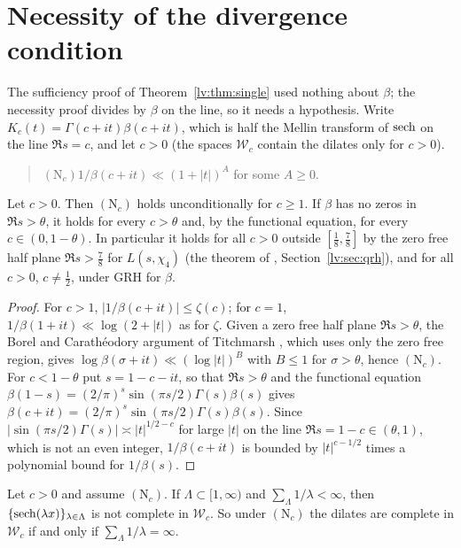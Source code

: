 \section{Necessity of the divergence condition}\label{lv:sec:nec}

The sufficiency proof of Theorem~\ref{lv:thm:single} used nothing about $\beta$; the necessity proof divides by $\beta$ on the line, so it needs a hypothesis. Write $K_c(t)=\Gamma(c+it)\beta(c+it)$, which is half the Mellin transform of $\operatorname{sech}$ on the line $\Re s=c$, and let $c>0$ (the spaces $\mathcal W_c$ contain the dilates only for $c>0$).
\begin{quote}
$(\mathrm N_c)$\quad $1/\beta(c+it)\ll(1+|t|)^{A}$ for some $A\ge0$.
\end{quote}

\begin{lemma}\label{lv:lem:Nc}
Let $c>0$. Then $(\mathrm N_c)$ holds unconditionally for $c\ge1$. If $\beta$ has no zeros in $\Re s>\theta$, it holds for every $c>\theta$ and, by the functional equation, for every $c\in(0,1-\theta)$. In particular it holds for all $c>0$ outside $[\frac18,\frac78]$ by the zero free half plane $\Re s>\frac78$ for $L(s,\chi_4)$ (the theorem of \cite{OAI26a}, Section~\ref{lv:sec:qrh}), and for all $c>0$, $c\ne\frac12$, under GRH for $\beta$.
\end{lemma}

\begin{proof}
For $c>1$, $|1/\beta(c+it)|\le\zeta(c)$; for $c=1$, $1/\beta(1+it)\ll\log(2+|t|)$ as for $\zeta$. Given a zero free half plane $\Re s>\theta$, the Borel and Carath\'eodory argument of Titchmarsh \cite[Theorem 14.2]{Titchmarsh}, which uses only the zero free region, gives $\log\beta(\sigma+it)\ll(\log|t|)^{B}$ with $B\le1$ for $\sigma>\theta$, hence $(\mathrm N_c)$. For $c<1-\theta$ put $s=1-c-it$, so that $\Re s>\theta$ and the functional equation $\beta(1-s)=(2/\pi)^s\sin(\pi s/2)\Gamma(s)\beta(s)$ gives $\beta(c+it)=(2/\pi)^s\sin(\pi s/2)\Gamma(s)\beta(s)$. Since $|\sin(\pi s/2)\Gamma(s)|\asymp|t|^{1/2-c}$ for large $|t|$ on the line $\Re s=1-c\in(\theta,1)$, which is not an even integer, $1/\beta(c+it)$ is bounded by $|t|^{c-1/2}$ times a polynomial bound for $1/\beta(s)$.
\end{proof}

\begin{theorem}[necessity]\label{lv:thm:nec}
Let $c>0$ and assume $(\mathrm N_c)$. If $\Lambda\subset[1,\infty)$ and $\sum_\Lambda1/\lambda<\infty$, then $\{\operatorname{sech}(\lambda x)\}_{\lambda\in\Lambda}$ is not complete in $\mathcal W_c$. So under $(\mathrm N_c)$ the dilates are complete in $\mathcal W_c$ if and only if $\sum_\Lambda1/\lambda=\infty$.
\end{theorem}

